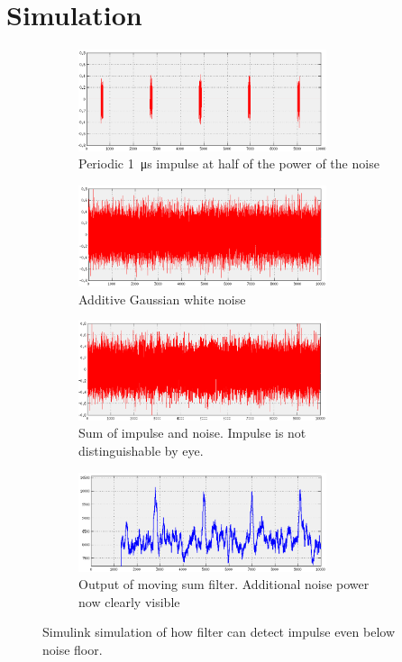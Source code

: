 \section{Simulation}
\begin{figure}
  \begin{subfigure}{\textwidth}
    \centering
    \includegraphics[width=0.8\textwidth]{impulse}
    \caption{Periodic \SI{1}{\micro\second} impulse at half of the power of the noise}
  \end{subfigure}
  \begin{subfigure}{\textwidth}
    \centering
    \includegraphics[width=0.8\textwidth]{noise}
    \caption{Additive Gaussian white noise}
  \end{subfigure}
  \begin{subfigure}{\textwidth}
    \centering
    \includegraphics[width=0.8\textwidth]{impulse-plus-noise}
    \caption{Sum of impulse and noise. Impulse is not distinguishable by eye.}
  \end{subfigure}
  \begin{subfigure}{\textwidth}
    \centering
    \includegraphics[width=0.8\textwidth]{filter}
    \caption{Output of moving sum filter. Additional noise power now clearly visible}
  \end{subfigure}
  \caption{Simulink simulation of how filter can detect impulse even below noise floor.}
  \label{fig:firmware:impulse-detection-simulation}
\end{figure}
